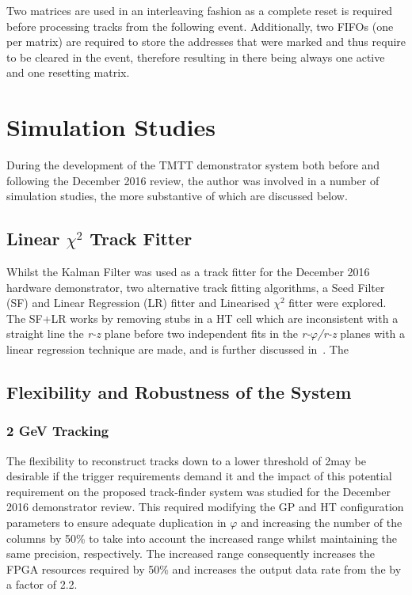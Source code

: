 Two matrices are used in an interleaving fashion as a complete reset is required before processing tracks from the following event.
Additionally, two FIFOs (one per matrix) are required to store the addresses that were marked and thus require to be cleared in the event, therefore resulting in there being always one active and one resetting matrix.

\section{Simulation Studies}
During the development of the TMTT demonstrator system both before and following the December 2016 review, the author was involved in a number of simulation studies, the more substantive of which are discussed below.

\subsection{Linear $\chi^{2}$ Track Fitter}
Whilst the Kalman Filter was used as a track fitter for the December 2016 hardware demonstrator, two alternative track fitting algorithms, a Seed Filter (SF) and Linear Regression (LR) fitter and Linearised $\chi^{2}$ fitter were explored.
The SF+LR works by removing stubs in a HT cell which are inconsistent with a straight line the \emph{r-z} plane before  two independent fits in the \emph{r-$\varphi$/r-z} planes with a linear regression technique are made, and is further discussed in~\cite{TMTT_FLP}.
The 



\subsection{Flexibility and Robustness of the System}
\subsubsection{2 GeV Tracking}
The flexibility to reconstruct tracks down to a lower \pT threshold of 2\GeV may be desirable if the trigger requirements demand it and the impact of this potential requirement on the proposed track-finder system was studied for the December 2016 demonstrator review.
This required modifying the GP and HT configuration parameters to ensure adequate duplication in $\varphi$ and increasing the number of the \qpt columns by 50\% to take into account the increased \pt range whilst maintaining the same precision, respectively.
The increased \qpt range consequently increases the FPGA resources required by 50\% and increases the output data rate from the \HT by a factor of 2.2.

